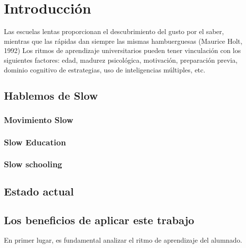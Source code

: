 \chapter{Introducci\'on}
Las escuelas lentas proporcionan el descubrimiento del gusto por el saber, mientras que las r\'apidas dan siempre las mismas hambuerguesas (Maurice Holt, 1992)
Los ritmos de aprendizaje universitarios pueden tener vinculaci\'on con los siguientes factores: edad, madurez psicol\'ogica, motivaci\'on, preparaci\'on 
previa, dominio cognitivo de estrategias, uso de inteligencias m\'ultiples, etc.


\section{Hablemos de Slow}

\subsection{Movimiento Slow}
\subsection{Slow Education}
\subsection{Slow schooling}



\section{Estado actual}\label{ch1:opts}

\section{Los beneficios de aplicar este trabajo}
En primer lugar, es fundamental analizar el ritmo de aprendizaje del alumnado.
